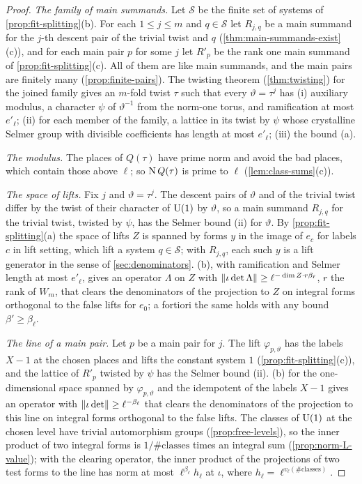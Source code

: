 \begin{proof}
\emph{The family of main summands.} Let $\mathcal S$ be the finite set of systems of \cref{prop:fit-splitting}(b). For each $1\le j\le m$ and $q\in\mathcal S$ let $R_{j,q}$ be a main summand for the $j$-th descent pair of the trivial twist and $q$ (\cref{thm:main-summands-exist}(c)), and for each main pair $p$ for some $j$ let $R'_p$ be the rank one main summand
of \cref{prop:fit-splitting}(c). All of them are like main summands, and the main pairs are finitely many (\cref{prop:finite-pairs}). The twisting theorem (\cref{thm:twisting}) for the joined family gives an $m$-fold twist $\tau$ such that every $\vartheta=\tau^j$ has (i) auxiliary modulus, a character $\psi$ of $\vartheta^{-1}$ from the
norm-one torus, and ramification at most $e'_\ell$; (ii) for each member of the family, a lattice in its twist by $\psi$ whose crystalline Selmer group with divisible coefficients has length at most $e'_\ell$; (iii) the bound (a).

\emph{The modulus.} The places of $Q(\tau)$ have prime norm and avoid the bad places, which contain those above $\ell$; so $\operatorname{N} Q(\tau)$ is prime to $\ell$ (\cref{lem:class-sums}(c)).

\emph{The space of lifts.} Fix $j$ and $\vartheta=\tau^j$. The descent pairs of $\vartheta$ and of the trivial twist differ by the twist of their character of $\operatorname{U}(1)$ by $\vartheta$, so a main summand $R_{j,q}$ for the trivial twist, twisted by $\psi$, has the Selmer bound (ii) for $\vartheta$. By \cref{prop:fit-splitting}(a) the space of lifts $Z$ is spanned by
forms $y$ in the image of $e_c$ for labels $c$ in lift setting, which lift a system $q\in\mathcal S$; with $R_{j,q}$, each such $y$ is a lift generator in the sense of \cref{sec:denominators}. (b), with ramification and Selmer length at most $e'_\ell$, gives an operator $\Lambda$ on $Z$ with
$\lVert \iota\det\Lambda\rVert\ge\ell^{-\dim Z\cdot r\beta_\ell}$, $r$ the rank of $W_m$, that clears the denominators of the projection to $Z$ on integral forms orthogonal to the false lifts for $e_0$; a fortiori the same holds with any bound $\beta'\ge\beta_\ell$.

\emph{The line of a main pair.} Let $p$ be a main pair for $j$. The lift $\varphi_{p,\vartheta}$ has the labels $X-1$ at the chosen places and lifts the constant system $1$ (\cref{prop:fit-splitting}(c)), and the lattice of $R'_p$ twisted by $\psi$ has the Selmer bound (ii). (b) for the one-dimensional space spanned
by $\varphi_{p,\vartheta}$ and the idempotent of the labels $X-1$ gives an operator with $\lVert \iota\det\rVert\ge\ell^{-\beta_\ell}$ that clears the denominators of the projection to this line on integral forms orthogonal to the false lifts. The classes of $\operatorname{U}(1)$ at the chosen level have trivial automorphism groups (\cref{prop:free-levels}), so the
inner product of two integral forms is $1/\#\mathrm{classes}$ times an integral sum (\cref{prop:norm-L-value}); with the clearing operator, the inner product of the projections of two test forms to the line has norm at most $\ell^{\beta_\ell}h_\ell$ at $\iota$, where $h_\ell=\ell^{v_\ell(\#\mathrm{classes})}$.
\end{proof}


